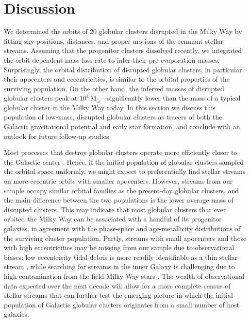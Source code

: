 \documentclass[twocolumn]{aastex63}
\newcommand{\msun}{\ensuremath{\textrm{M}_\odot}}
\begin{document}
\section{Discussion}
\label{sec:discussion}

We determined the orbits of 20 globular clusters disrupted in the Milky Way by fitting sky positions, distances, and proper motions of the remnant stellar streams.
Assuming that the progenitor clusters dissolved recently, we integrated the orbit-dependent mass-loss rate to infer their pre-evaporation masses.
Surprisingly, the orbital distribution of disrupted globular clusters, in particular their apocenters and eccentricities, is similar to the orbital properties of the surviving population.
On the other hand, the inferred masses of disrupted globular clusters peak at $10^4\,\msun$---significantly lower than the mass of a typical globular cluster in the Milky Way today.
In this section we discuss this population of low-mass, disrupted globular clusters as tracers of both the Galactic gravitational potential and early star formation, and conclude with an outlook for future follow-up studies.

Most processes that destroy globular clusters operate more efficiently closer to the Galactic center \citep[e.g.,][]{gnedin:1997}.
Hence, if the initial population of globular clusters sampled the orbital space uniformly, we might expect to preferentially find stellar streams on more eccentric orbits with smaller apocenters.
However, streams from our sample occupy similar orbital families as the present-day globular clusters, and the main difference between the two populations is the lower average mass of disrupted clusters.
This may indicate that most globular clusters that ever orbited the Milky Way can be associated with a handful of its progenitor galaxies, in agreement with the phase-space \citep{massari:2019} and age-metallicity \citep{kruijssen19e} distributions of the surviving cluster population.
Partly, streams with small apocenters and those with high eccentricities may be missing from our sample due to observational biases: low eccentricity tidal debris is more readily identifiable as a thin stellar stream \citep{hendel:2015}, while searching for streams in the inner Galaxy is challenging due to high contamination from the field Milky Way stars \citep[e.g.,][]{ibata:2019}.
The wealth of observational data expected over the next decade will allow for a more complete census of stellar streams that can further test the emerging picture in which the initial population of Galactic globular clusters originates from a small number of host galaxies.
\end{document}
